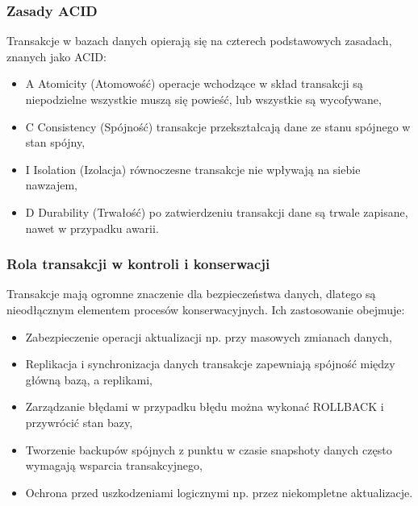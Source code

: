 \documentclass[a4paper,11pt,openany,english]{sphinxmanual}
\begin{document}
\subsubsection{Zasady ACID}
\label{\detokenize{rozdzial2/Kontrola_i_konserwacja/kontrola_i_konserwacja:zasady-acid}}
\sphinxAtStartPar
Transakcje w bazach danych opierają się na czterech podstawowych zasadach, znanych jako ACID:
\begin{itemize}
\item {} 
\sphinxAtStartPar
A \sphinxhyphen{} Atomicity (Atomowość) \sphinxhyphen{} operacje wchodzące w skład transakcji są niepodzielne \sphinxhyphen{} wszystkie muszą się powieść, lub wszystkie są wycofywane,

\item {} 
\sphinxAtStartPar
C \sphinxhyphen{} Consistency (Spójność) \sphinxhyphen{} transakcje przekształcają dane ze stanu spójnego w stan spójny,

\item {} 
\sphinxAtStartPar
I \sphinxhyphen{} Isolation (Izolacja) \sphinxhyphen{} równoczesne transakcje nie wpływają na siebie nawzajem,

\item {} 
\sphinxAtStartPar
D \sphinxhyphen{} Durability (Trwałość) \sphinxhyphen{} po zatwierdzeniu transakcji dane są trwale zapisane, nawet w przypadku awarii.

\end{itemize}


\subsubsection{Rola transakcji w kontroli i konserwacji}
\label{\detokenize{rozdzial2/Kontrola_i_konserwacja/kontrola_i_konserwacja:rola-transakcji-w-kontroli-i-konserwacji}}
\sphinxAtStartPar
Transakcje mają ogromne znaczenie dla bezpieczeństwa danych, dlatego są nieodłącznym elementem procesów konserwacyjnych. Ich zastosowanie obejmuje:
\begin{itemize}
\item {} 
\sphinxAtStartPar
Zabezpieczenie operacji aktualizacji \sphinxhyphen{} np. przy masowych zmianach danych,

\item {} 
\sphinxAtStartPar
Replikacja i synchronizacja danych \sphinxhyphen{} transakcje zapewniają spójność między główną bazą, a replikami,

\item {} 
\sphinxAtStartPar
Zarządzanie błędami \sphinxhyphen{} w przypadku błędu można wykonać ROLLBACK i przywrócić stan bazy,

\item {} 
\sphinxAtStartPar
Tworzenie backupów spójnych z punktu w czasie \sphinxhyphen{} snapshoty danych często wymagają wsparcia transakcyjnego,

\item {} 
\sphinxAtStartPar
Ochrona przed uszkodzeniami logicznymi \sphinxhyphen{} np. przez niekompletne aktualizacje.

\end{itemize}
\end{document}
